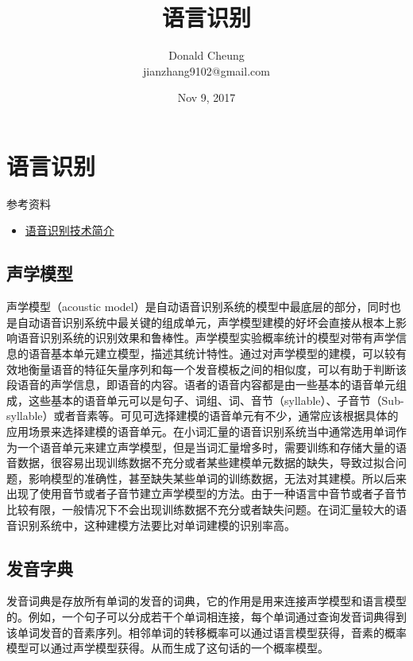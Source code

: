 \documentclass[10pt,a4paper]{ctexbook}
\begin{document}
    \setlength{\baselineskip}{20pt}
    \title{语言识别}
    \author{Donald Cheung\\jianzhang9102@gmail.com}
    \date{Nov 9, 2017}
    \tableofcontents
\fi

\chapter{语言识别}
参考资料
\begin{itemize}
\item \href{http://blog.csdn.net/rfc2008/article/details/9151755?utm_source=tuicool&utm_medium=referral}{语音识别技术简介}
\end{itemize}

\section{声学模型}
声学模型（acoustic model）是自动语音识别系统的模型中最底层的部分，同时也是自动语音识别系统中最关键的组成单元，声学模型建模的好坏会直接从根本上影响语音识别系统的识别效果和鲁棒性。声学模型实验概率统计的模型对带有声学信息的语音基本单元建立模型，描述其统计特性。通过对声学模型的建模，可以较有效地衡量语音的特征矢量序列和每一个发音模板之间的相似度，可以有助于判断该段语音的声学信息，即语音的内容。语者的语音内容都是由一些基本的语音单元组成，这些基本的语音单元可以是句子、词组、词、音节（syllable）、子音节（Sub-syllable）或者音素等。可见可选择建模的语音单元有不少，通常应该根据具体的应用场景来选择建模的语音单元。在小词汇量的语音识别系统当中通常选用单词作为一个语音单元来建立声学模型，但是当词汇量增多时，需要训练和存储大量的语音数据，很容易出现训练数据不充分或者某些建模单元数据的缺失，导致过拟合问题，影响模型的准确性，甚至缺失某些单词的训练数据，无法对其建模。所以后来出现了使用音节或者子音节建立声学模型的方法。由于一种语言中音节或者子音节比较有限，一般情况下不会出现训练数据不充分或者缺失问题。在词汇量较大的语音识别系统中，这种建模方法要比对单词建模的识别率高。

\section{发音字典}
发音词典是存放所有单词的发音的词典，它的作用是用来连接声学模型和语言模型的。例如，一个句子可以分成若干个单词相连接，每个单词通过查询发音词典得到该单词发音的音素序列。相邻单词的转移概率可以通过语言模型获得，音素的概率模型可以通过声学模型获得。从而生成了这句话的一个概率模型。
\end{document}
